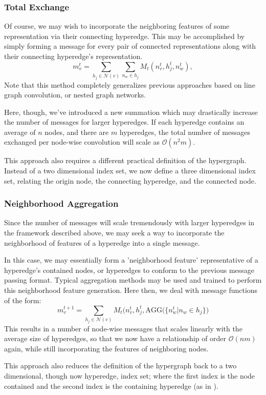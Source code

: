 \documentclass[10pt,a4paper]{article}
\begin{document}
\subsubsection{Total Exchange}
Of course, we may wish to incorporate the neighboring features of some representation via their connecting hyperedge. This may be accomplished by simply forming a message for every pair of connected representations along with their connecting hyperedge's representation.
$$
m_v^{t} = \sum_{h_j\in \mathcal{N}(v)} \sum_{n_w \in h_j } M_t(n_v^{t},h_j^{t}, n_w^t),
$$
Note that this method completely generalizes previous approaches based on line graph convolution, or nested graph networks.

Here, though, we've introduced a new summation which may drastically increase the number of messages for larger hyperedges. If each hyperedge contains an average of $n$ nodes, and there are $m$ hyperedges, the total number of messages exchanged per node-wise convolution will scale as $\mathcal{O}(n^2m)$.

This approach also requires a different practical definition of the hypergraph.  Instead of a two dimensional index set, we now define a three dimensional index set, relating the origin node, the connecting hyperedge, and the connected node.

\subsubsection{Neighborhood Aggregation}
Since the number of messages will scale tremendously with larger hyperedges in the framework described above, we may seek a way to incorporate the neighborhood of features of a hyperedge into a single message.

In this case, we may essentially form a 'neighborhood feature' representative of a hyperedge's contained nodes, or hyperedges to conform to the previous message passing format. Typical aggregation methods may be used and trained to perform this neighborhood feature generation. Here then, we deal with message functions of the form:
$$
m_v^{t+1}=\sum_{h_j\in \mathcal{N}(v)} M_t(n_v^{t},h_j^{t},\text{AGG}\big(\lbrace n_w^t \vert n_w \in h_j \rbrace\big)
$$
This results in a number of node-wise messages that scales linearly with the average size of hyperedges, so that we now have a relationship of order $\mathcal{O}(nm)$ again, while still incorporating the features of neighboring nodes.

This approach also reduces the definition of the hypergraph back to a two dimensional, though now hyperedge, index set; where the first index is the node contained and the second index is the containing hyperedge (as in \cite{hypergraphconv}).
\end{document}

